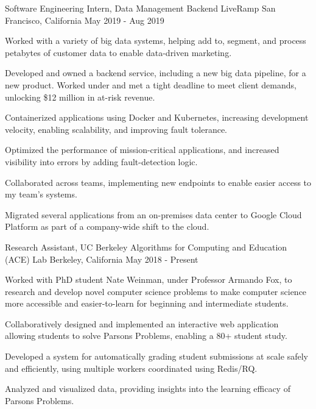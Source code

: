 

\begin{cventries}

    \cventry
      {Software Engineering Intern, Data Management Backend}
      {LiveRamp}
      {San Francisco, California}
      {May 2019 - Aug 2019}
      {
        \begin{cvitems}
          \item Worked with a variety of big data systems, helping add to, segment, and process petabytes of customer data to enable data-driven marketing.
          \item Developed and owned a backend service, including a new big data pipeline, for a new product. Worked under and met a tight deadline to meet client demands, unlocking \$12 million in at-risk revenue.
          \item Containerized applications using Docker and Kubernetes, increasing development velocity, enabling scalability, and improving fault tolerance.         
          \item Optimized the performance of mission-critical applications, and increased visibility into errors by adding fault-detection logic.
          \item Collaborated across teams, implementing new endpoints to enable easier access to my team's systems.
          \item Migrated several applications from an on-premises data center to Google Cloud Platform as part of a company-wide shift to the cloud.
        \end{cvitems}
      }

    \cventry
      {Research Assistant, UC Berkeley}
      {Algorithms for Computing and Education (ACE) Lab}
      {Berkeley, California}
      {May 2018 - Present}
      {
        \begin{cvitems}
          \item Worked with PhD student Nate Weinman, under Professor Armando Fox, to research and develop novel computer science problems
          to make computer science more accessible and easier-to-learn for beginning and intermediate students.
          \item Collaboratively designed and implemented an interactive web application allowing students to solve Parsons Problems, enabling a 80+ student study. 
          \item Developed a system for automatically grading student submissions at scale safely and efficiently, using multiple workers coordinated using Redis/RQ.
          \item Analyzed and visualized data, providing insights into the learning efficacy of Parsons Problems.
        \end{cvitems}  
      }

\end{cventries}
